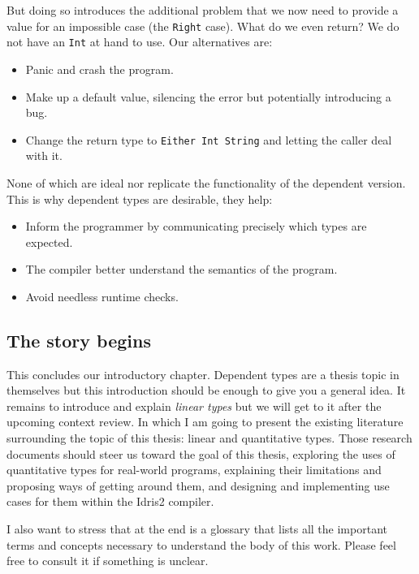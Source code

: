 \documentclass[
]{article}
\providecommand{\tightlist}{%
  \setlength{\itemsep}{0pt}\setlength{\parskip}{0pt}}
\begin{document}
But doing so introduces the additional problem that we now need to
provide a value for an impossible case (the \texttt{Right} case). What
do we even return? We do not have an \texttt{Int} at hand to use. Our
alternatives are:

\begin{itemize}
\tightlist
\item
  Panic and crash the program.
\item
  Make up a default value, silencing the error but potentially
  introducing a bug.
\item
  Change the return type to \texttt{Either\ Int\ String} and letting the
  caller deal with it.
\end{itemize}

None of which are ideal nor replicate the functionality of the dependent
version. This is why dependent types are desirable, they help:

\begin{itemize}
\tightlist
\item
  Inform the programmer by communicating precisely which types are
  expected.
\item
  The compiler better understand the semantics of the program.
\item
  Avoid needless runtime checks.
\end{itemize}

\hypertarget{the-story-begins}{%
\subsection{The story begins}\label{the-story-begins}}

This concludes our introductory chapter. Dependent types are a thesis
topic in themselves but this introduction should be enough to give you a
general idea. It remains to introduce and explain \emph{linear types}
but we will get to it after the upcoming context review. In which I am
going to present the existing literature surrounding the topic of this
thesis: linear and quantitative types. Those research documents should
steer us toward the goal of this thesis, exploring the uses of
quantitative types for real-world programs, explaining their limitations
and proposing ways of getting around them, and designing and
implementing use cases for them within the Idris2 compiler.

I also want to stress that at the end is a glossary that lists all the
important terms and concepts necessary to understand the body of this
work. Please feel free to consult it if something is unclear.
\end{document}
